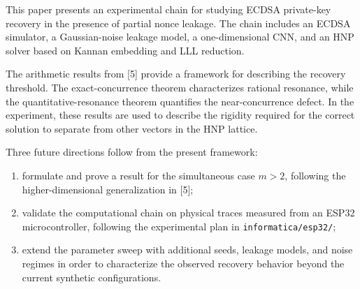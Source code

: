 \documentclass[11pt,a4paper]{article}
\begin{document}
This paper presents an experimental chain for studying ECDSA private-key recovery in the presence of partial nonce leakage. The chain includes an ECDSA simulator, a Gaussian-noise leakage model, a one-dimensional CNN, and an HNP solver based on Kannan embedding and LLL reduction.

The arithmetic results from [5] provide a framework for describing the recovery threshold. The exact-concurrence theorem characterizes rational resonance, while the quantitative-resonance theorem quantifies the near-concurrence defect. In the experiment, these results are used to describe the rigidity required for the correct solution to separate from other vectors in the HNP lattice.

Three future directions follow from the present framework:
\begin{enumerate}[label=(\alph*),leftmargin=2.5em]
\item formulate and prove a result for the simultaneous case $m>2$, following the higher-dimensional generalization in [5];
\item validate the computational chain on physical traces measured from an ESP32 microcontroller, following the experimental plan in \texttt{informatica/esp32/};
\item extend the parameter sweep with additional seeds, leakage models, and noise regimes in order to characterize the observed recovery behavior beyond the current synthetic configurations.
\end{enumerate}
\end{document}
